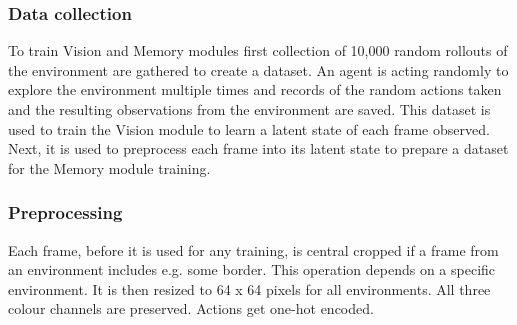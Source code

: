 \subsubsection{Data collection}
To train Vision and Memory modules first collection of 10,000 random rollouts of the environment are gathered to create a dataset. An agent is acting randomly to explore the environment multiple times and records of the random actions taken and the resulting observations from the environment are saved.
This dataset is used to train the Vision module to learn a latent state of each frame observed. Next, it is used to preprocess each frame into its latent state to prepare a dataset for the Memory module training.

\subsubsection{Preprocessing}
Each frame, before it is used for any training, is central cropped if a frame from an environment includes e.g. some border. This operation depends on a specific environment. It is then resized to 64 x 64 pixels for all environments. All three colour channels are preserved. Actions get one-hot encoded.

